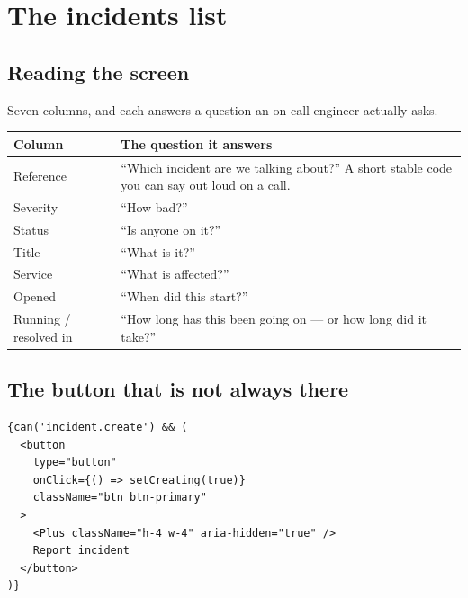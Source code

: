 \chapter{The incidents list}
\label{ch:incidents}


\section{Reading the screen}

Seven columns, and each answers a question an on-call engineer actually asks.

\begin{center}
\begin{tabular}{@{}>{\raggedright\arraybackslash}p{4.4cm}p{9.3cm}@{}}
\toprule
\textbf{Column} & \textbf{The question it answers} \\
\midrule
Reference & ``Which incident are we talking about?'' A short stable code you can say out loud on a call. \\
Severity & ``How bad?'' \\
Status & ``Is anyone on it?'' \\
Title & ``What is it?'' \\
Service & ``What is affected?'' \\
Opened & ``When did this start?'' \\
Running / resolved in & ``How long has this been going on --- or how long did it take?'' \\
\bottomrule
\end{tabular}
\end{center}


\section{The button that is not always there}

\begin{lstlisting}[language=tsx]
{can('incident.create') && (
  <button
    type="button"
    onClick={() => setCreating(true)}
    className="btn btn-primary"
  >
    <Plus className="h-4 w-4" aria-hidden="true" />
    Report incident
  </button>
)}
\end{lstlisting}

